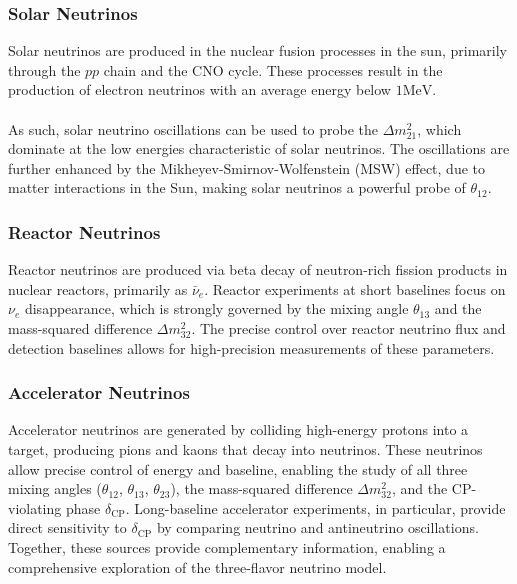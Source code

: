 \documentclass[a4paper,12pt,numbered]{article}
\begin{document}
\subsubsection{Solar Neutrinos}

Solar neutrinos are produced in the nuclear fusion processes in the sun, primarily through the $pp$ chain and the CNO cycle. These processes result in the production of electron neutrinos with an average energy below $1 \text{MeV}$.
\\ \\
As such, solar neutrino oscillations can be used to probe the 
$\Delta m^2_{21}$, which dominate at the low energies characteristic of solar neutrinos. The oscillations are further enhanced by the Mikheyev-Smirnov-Wolfenstein (MSW) effect, due to matter interactions in the Sun, making solar neutrinos a powerful probe of $\theta_{12}$.

\subsubsection{Reactor Neutrinos}

Reactor neutrinos are produced via beta decay of neutron-rich fission products in nuclear reactors, primarily as $\bar{\nu}_e$. Reactor experiments at short baselines focus on $\nu_e$ disappearance, which is strongly governed by the mixing angle $\theta_{13}$ and the mass-squared difference $\Delta m^2_{32}$. The precise control over reactor neutrino flux and detection baselines allows for high-precision measurements of these parameters.

\subsubsection{Accelerator Neutrinos}

Accelerator neutrinos are generated by colliding high-energy protons into a target, producing pions and kaons that decay into neutrinos. These neutrinos allow precise control of energy and baseline, enabling the study of all three mixing angles ($\theta_{12}$, $\theta_{13}$, $\theta_{23}$), the mass-squared difference $\Delta m^2_{32}$, and the CP-violating phase $\delta_{\text{CP}}$. Long-baseline accelerator experiments, in particular, provide direct sensitivity to $\delta_{\text{CP}}$ by comparing neutrino and antineutrino oscillations. Together, these sources provide complementary information, enabling a comprehensive exploration of the three-flavor neutrino model.
\end{document}
